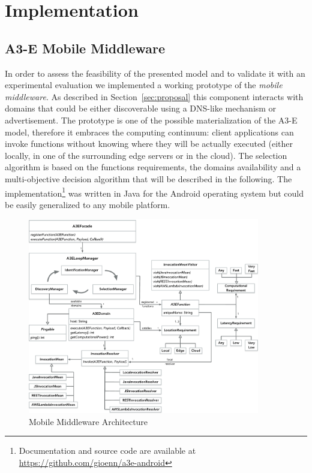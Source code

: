 \section{Implementation}
\subsection{A3-E Mobile Middleware}

In order to assess the feasibility of the presented model and to validate it with an experimental evaluation we implemented a working prototype of the \textit{mobile middleware}. As described in Section~\ref{sec:proposal} this component interacts with  domains that could be either discoverable using a DNS-like mechanism or advertisement. The prototype is one of the possible materialization of the A3-E model, therefore it embraces the computing continuum: client applications can invoke functions without knowing where they will be actually executed (either locally, in one of the surrounding edge servers or in the cloud). The selection algorithm is based on the functions requirements, the domains availability and a multi-objective decision algorithm that will be described in the following. The implementation\footnote{Documentation and source code are available at \url{https://github.com/gioenn/a3e-android}} was written in Java for the Android operating system but could be easily generalized to any mobile platform. 
\begin{figure}[tbp]
	\includegraphics[width=0.9\textwidth]{figs/a3e-mobile-prototype}
	\caption{Mobile Middleware Architecture}
	\label{fig:mobile-prototype}
\end{figure}

